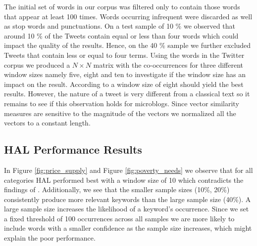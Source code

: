 The initial set of words in our corpus was filtered only to contain those words that appear at least 100 times. Words occurring infrequent were discarded as well as stop words and punctuations. On a test sample of 10 \% we observed that around 10 \% of the Tweets contain equal or less than four words which could impact the quality of the results. Hence, on the 40 \% sample we further excluded Tweets that contain less or equal to four terms. Using the words in the Twitter corpus we produced a $N \times N$ matrix with the co-occurrences for three different window sizes namely five, eight and ten to investigate if the window size has an impact on the result. According to \cite{lund96} a window size of eight should yield the best results. However, the nature of a tweet is very different from a classical text so it remains to see if this observation holds for microblogs. Since vector similarity measures are sensitive to the magnitude of the vectors we normalized all the vectors to a constant length. 

\subsection{HAL Performance Results}


In Figure \ref{fig:price_supply} and Figure \ref{fig:poverty_needs} we observe that for all categories HAL performed best with a window size of 10 which contradicts the findings of \cite{lund96}. Additionally, we see that the smaller sample sizes (10\%, 20\%) consistently produce more relevant keywords than the large sample size (40\%). A large sample size increases the likelihood of a keyword's occurrence. Since we set a fixed threshold of 100 occurrences across all samples we are more likely to include words with a smaller confidence as the sample size increases, which might explain the poor performance. 


